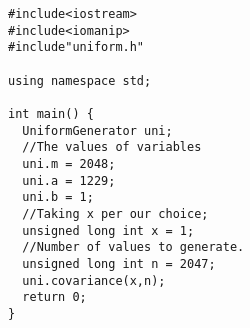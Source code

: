 \documentclass{article}
\begin{document}

\begin{lstlisting}
#include<iostream>
#include<iomanip>
#include"uniform.h"

using namespace std;

int main() {
  UniformGenerator uni;
  //The values of variables
  uni.m = 2048;
  uni.a = 1229;
  uni.b = 1;
  //Taking x per our choice;
  unsigned long int x = 1;
  //Number of values to generate.
  unsigned long int n = 2047;
  uni.covariance(x,n);
  return 0;
}

\end{lstlisting}

\begin {figure}
\begin{center}
	
\end{center}
\end {figure}
\end{document}

